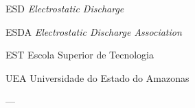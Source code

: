 \documentclass[
	12pt,				%
	openright,			%
	oneside,			%
	a4paper,			%
	chapter=TITLE,		%
	english,			%
	french,				%
	spanish,			%
	brazil,				%
	article,			%
	]{uea-abntex2}
\begin{document}
\frenchspacing 


\imprimircapa

\imprimirfolhaderosto




\begin{siglas}
  \item[ESD] \textit{Electrostatic Discharge}
  \item[ESDA] \textit{Electrostatic Discharge Association}
  \item[EST] Escola Superior de Tecnologia
  \item[UEA] Universidade do Estado do Amazonas 
\end{siglas}
 ---

\renewcommand{\contentsname}{\vspace*{3.4cm}SUMÁRIO}
\tableofcontents*

\end{document}

